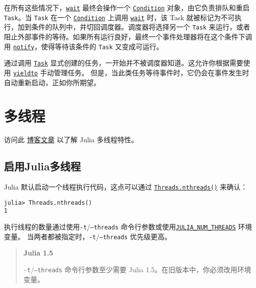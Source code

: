 在所有这些情况下，\hyperlink{13761789780433862250}{\texttt{wait}} 最终会操作一个 \hyperlink{286351753995469758}{\texttt{Condition}} 对象，由它负责排队和重启 \texttt{Task}。当 \texttt{Task} 在一个 \hyperlink{286351753995469758}{\texttt{Condition}} 上调用 \hyperlink{13761789780433862250}{\texttt{wait}} 时，该 Task 就被标记为不可执行，加到条件的队列中，并切回调度器。调度器将选择另一个 \texttt{Task} 来运行，或者阻止外部事件的等待。如果所有运行良好，最终一个事件处理器将在这个条件下调用 \hyperlink{2865179286002578885}{\texttt{notify}}，使得等待该条件的 \texttt{Task} 又变成可运行。



通过调用 \hyperlink{7131243650304654155}{\texttt{Task}} 显式创建的任务，一开始并不被调度器知道。这允许你根据需要使用 \hyperlink{4920987536368477483}{\texttt{yieldto}} 手动管理任务。 但是，当此类任务等待事件时，它仍会在事件发生时自动重新启动，正如你所期望。



\hypertarget{7129488293979654813}{}


\chapter{多线程}



访问此 \href{https://julialang.org/blog/2019/07/multithreading/}{博客文章} 以了解 Julia 多线程特性。



\hypertarget{17964156815953179574}{}


\section{启用Julia多线程}



Julia 默认启动一个线程执行代码，这点可以通过 \hyperlink{11061583461116144745}{\texttt{Threads.nthreads()}} 来确认：




\begin{verbatim}
julia> Threads.nthreads()
1
\end{verbatim}



执行线程的数量通过使用\texttt{-t}/\texttt{--threads} 命令行参数或使用\hyperlink{16384778780724552380}{\texttt{JULIA\_NUM\_THREADS}} 环境变量。 当两者都被指定时，\texttt{-t}/\texttt{--threads} 优先级更高。



\begin{quote}
\textbf{Julia 1.5}

\texttt{-t}/\texttt{--threads} 命令行参数至少需要 Julia 1.5。在旧版本中，你必须改用环境变量。

\end{quote}


